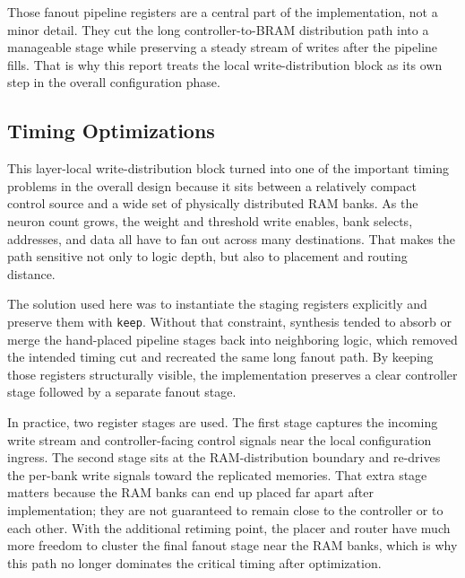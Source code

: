 Those fanout pipeline registers are a central part of the implementation, not a
minor detail. They cut the long controller-to-BRAM distribution path into a
manageable stage while preserving a steady stream of writes after the pipeline
fills. That is why this report treats the local write-distribution block as its
own step in the overall configuration phase.

\clearpage
\begin{strip}
  \centering
  \resizebox{0.90\textwidth}{!}{}
  \label{fig:config-controller-block}
\end{strip}

\subsection{Timing Optimizations}

This layer-local write-distribution block turned into one of the important
timing problems in the overall design because it sits between a relatively
compact control source and a wide set of physically distributed RAM banks. As
the neuron count grows, the weight and threshold write enables, bank selects,
addresses, and data all have to fan out across many destinations. That makes
the path sensitive not only to logic depth, but also to placement and routing
distance.

The solution used here was to instantiate the staging registers explicitly and
preserve them with \texttt{keep}. Without that constraint, synthesis tended to
absorb or merge the hand-placed pipeline stages back into neighboring logic,
which removed the intended timing cut and recreated the same long fanout path.
By keeping those registers structurally visible, the implementation preserves a
clear controller stage followed by a separate fanout stage.

In practice, two register stages are used. The first stage captures the
incoming write stream and controller-facing control signals near the local
configuration ingress. The second stage sits at the RAM-distribution boundary
and re-drives the per-bank write signals toward the replicated memories. That
extra stage matters because the RAM banks can end up placed far apart after
implementation; they are not guaranteed to remain close to the controller or to
each other. With the additional retiming point, the placer and router have much
more freedom to cluster the final fanout stage near the RAM banks, which is why
this path no longer dominates the critical timing after optimization.

\clearpage
